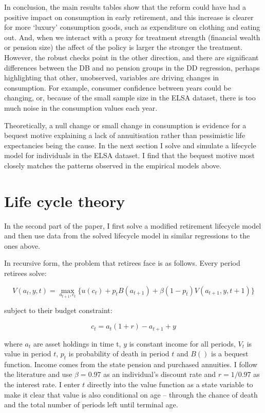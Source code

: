 \documentclass[12pt]{article}
\begin{document}
In conclusion, the main results tables show that the reform could have had a
positive impact on consumption in early retirement, and this increase is clearer
for more `luxury' consumption goods, such as expenditure on clothing and eating
out. And, when we interact with a proxy for treatment strength (financial wealth
or pension size) the affect of the policy is larger the stronger the treatment.
However, the robust checks point in the other direction, and there are
significant differences between the DB and no pension groups in the DD
regression, perhaps highlighting that other, unobserved, variables are driving
changes in consumption. For example, consumer confidence between years could be
changing, or, because of the small sample size in the ELSA dataset, there is too
much noise in the consumption values each year.

Theoretically, a null change or small change in consumption is evidence for a
bequest motive explaining a lack of annuitisation rather than pessimistic life
expectancies being the cause. In the next section I solve and simulate a
lifecycle model for individuals in the ELSA dataset. I find that the bequest
motive most closely matches the patterns observed in the empirical models above.

\section{Life cycle theory}

In the second part of the paper, I first solve a modified retirement lifecycle
model and then use data from the solved lifecycle model in similar regressions
to the ones above.

In recursive form, the problem that retirees face is as follows. Every period
retirees solve:

\begin{equation*}
    V(a_{t}, y, t) = \underset{a_{t+1}, c_{t}}{\max} \{ u(c_{t}) + p_{t}B(a_{t+1}) + \beta(1-p_{t})V(a_{t+1}, y, t+1) \}
\end{equation*}

subject to their budget constraint:

\begin{equation*}
    c_{t} =a_{
    t}(1 +r) -  a_{t+1} + y
\end{equation*}

where $a_{t}$ are asset holdings in time t, $y$ is constant income for all
periods, $V_{t}$ is value in period $t$, $p_{t}$ is probability of death in
period $t$ and $B()$ is a bequest function. Income comes from the state pension
and purchased annuities. I follow the literature and use $\beta = 0.97$ as an
individual's discount rate and $r = 1/0.97$ as the interest rate. I enter $t$
directly into the value function as a state variable to make it clear that value
is also conditional on age -- through the chance of death and the total number
of periods left until terminal age.
\end{document}
